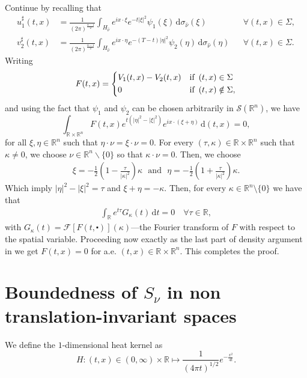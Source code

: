 \documentclass[10pt,a4paper]{amsart}
\theoremstyle{remark}
\theoremstyle{definition}
\newcommand{\R}{\mathbb{R}}
\newcommand{\dd}{\mathrm{d}}
\begin{document}
Continue by recalling that
\begin{align*}
u_1^\sharp (t, x) & = \frac{1}{(2\pi)^\frac{n-1}{2}} \int_{H_{\hat{\nu}}} e^{ix \cdot \xi} e^{- t |\xi|^2} {\psi_1}(\xi) \, \dd \sigma_{\hat{\nu}} (\xi) & & \forall(t, x) \in \Sigma, \\
v_2^\sharp (t, x) & = \frac{1}{(2\pi)^\frac{n-1}{2}} \int_{H_{\hat{\nu}}} e^{i x \cdot \eta} e^{-(T-t)|\eta|^2} {\psi_2}(\eta) \, \dd \sigma_{\hat{\nu}} (\eta) & & \forall(t, x) \in \Sigma.
\end{align*}
Writing
\begin{equation*}
	F (t, x) = \left\{
		\begin{aligned}
		& V_1 (t, x) - V_2 (t, x) &  & \textnormal{if} \enspace (t, x) \in \Sigma \\
		& 0 &  & \textnormal{if} \enspace (t, x) \notin \Sigma,
		\end{aligned}
	\right.
\end{equation*}
and using the fact that 
$\psi_1$ and $\psi_2$ can be chosen arbitrarily in $\mathcal{S}(\R^n)$, we have
$$
\int_{\mathbb{R} \times \mathbb{R}^n} F(t, x) e^{t(|\eta|^2-|\xi|^2)}   {e^{i x \cdot (\xi+\eta)} } \, \dd (t,x) = 0,
$$
for all $\xi, \eta\in \R^n$ such that $\eta \cdot \nu = \xi \cdot \nu=0$.
For every $(\tau, \kappa) \in \mathbb{R} \times \mathbb{R}^n$ such that $\kappa \neq 0$, we 
choose $\nu \in \mathbb{R}^n \backslash\{0\}$ so that $\kappa \cdot \nu=0$. Then, we choose
\begin{align*}
   \xi=- \frac{1}{2}(1-\frac{\tau}{|\kappa|^2})\kappa   ~~~\text{and}~~~ \eta= -\frac{1}{2}(1+\frac{\tau}{|\kappa|^2})\kappa.
\end{align*}
Which imply $|\eta|^2-|\xi|^2=\tau$ and $\xi+\eta=- \kappa$. Then, for every $\kappa \in \R^n \setminus \{ 0 \}$ we have that
\begin{align*}
\int_\R e^{t\tau} G_\kappa (t) \,\dd t = 0 \quad \forall \tau \in \R,
\end{align*}
with $ G_\kappa (t) = \mathcal{F}[F(t, \centerdot)](\kappa) $---the Fourier transform of $F$
with respect to the spatial variable.
Proceeding now exactly as the last part of density argument in
 we get $F(t, x)=0$ for a.e. $(t, x) \in \mathbb{R} \times \mathbb{R}^n$.
This completes the proof.


\section{Boundedness of \texorpdfstring{$S_\nu$}{Snu} in non translation-invariant spaces}
\label{sec:boundedness}
We define the $1$-dimensional heat kernel as
\begin{equation}
\label{id:1d_heat_kernel}
H: (t, x) \in (0,\infty) \times \R \longmapsto \frac{1}{(4\pi t)^{1/2}} e^{-\frac{x^2}{4t}}.
\end{equation}
\end{document}
